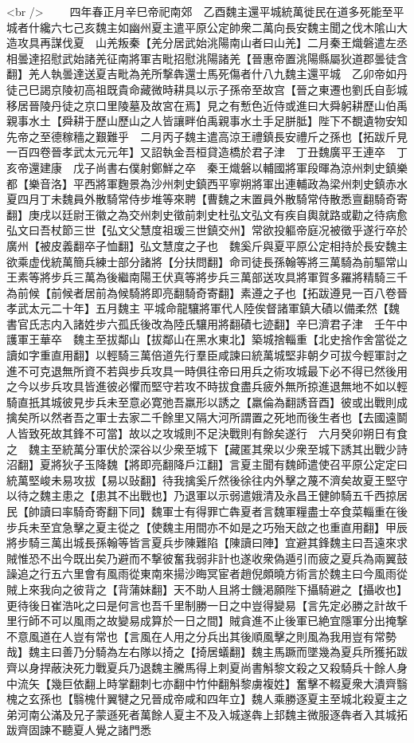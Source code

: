 <br />
　　四年春正月辛巳帝祀南郊　乙酉魏主還平城統萬徙民在道多死能至平城者什纔六七己亥魏主如幽州夏主遣平原公定帥衆二萬向長安魏主聞之伐木隂山大造攻具再謀伐夏　山羌叛秦【羌分居武始洮陽南山者曰山羌】二月秦王熾磐遣左丞相曇達招慰武始諸羌征南將軍吉毗招慰洮陽諸羌【晉惠帝置洮陽縣屬狄道郡曇徒含翻】羌人執曇達送夏吉毗為羌所撃犇還士馬死傷者什八九魏主還平城　乙卯帝如丹徒己巳謁京陵初高祖既貴命藏微時耕具以示子孫帝至故宫【晉之東遷也劉氏自彭城移居晉陵丹徒之京口里陵墓及故宮在焉】見之有慙色近侍或進曰大舜躬耕歷山伯禹親事水土【舜耕于歷山歷山之人皆讓畔伯禹親事水土手足胼胝】陛下不覩遺物安知先帝之至德稼穡之艱難乎　二月丙子魏主遣高涼王禮鎮長安禮斤之孫也【拓跋斤見一百四卷晉孝武太元元年】又詔執金吾桓貸造橋於君子津　丁丑魏廣平王連卒　丁亥帝還建康　戊子尚書右僕射鄭鮮之卒　秦王熾磐以輔國將軍段暉為涼州刺史鎮樂都【樂音洛】平西將軍麴景為沙州刺史鎮西平寧朔將軍出連輔政為梁州刺史鎮赤水　夏四月丁未魏員外散騎常侍步堆等來聘【曹魏之末置員外散騎常侍散悉亶翻騎奇寄翻】庚戌以廷尉王徽之為交州刺史徵前刺史杜弘文弘文有疾自輿就路或勸之待病愈弘文曰吾杖節三世【弘文父慧度祖瑗三世鎮交州】常欲投軀帝庭况被徵乎遂行卒於廣州【被皮義翻卒子恤翻】弘文慧度之子也　魏奚斤與夏平原公定相持於長安魏主欲乘虚伐統萬簡兵練士部分諸將【分扶問翻】命司徒長孫翰等將三萬騎為前驅常山王素等將步兵三萬為後繼南陽王伏真等將步兵三萬部送攻具將軍賀多羅將精騎三千為前候【前候者居前為候騎將即亮翻騎奇寄翻】素遵之子也【拓跋遵見一百八卷晉孝武太元二十年】五月魏主平城命龍驤將軍代人陸俟督諸軍鎮大磧以備柔然【魏書官氏志内入諸姓步六孤氏後改為陸氏驤用將翻磧七迹翻】辛巳濟君子津　壬午中護軍王華卒　魏主至拔鄰山【拔鄰山在黑水東北】築城捨輜重【北史捨作舍當從之讀如字重直用翻】以輕騎三萬倍道先行羣臣咸諫曰統萬城堅非朝夕可拔今輕軍討之進不可克退無所資不若與步兵攻具一時俱往帝曰用兵之術攻城最下必不得已然後用之今以步兵攻具皆進彼必懼而堅守若攻不時拔食盡兵疲外無所掠進退無地不如以輕騎直扺其城彼見步兵未至意必寛弛吾羸形以誘之【羸倫為翻誘音酉】彼或出戰則成擒矣所以然者吾之軍士去家二千餘里又隔大河所謂置之死地而後生者也【去國遠鬬人皆致死故其鋒不可當】故以之攻城則不足決戰則有餘矣遂行　六月癸卯朔日有食之　魏主至統萬分軍伏於深谷以少衆至城下【藏匿其衆以少衆至城下誘其出戰少詩沼翻】夏將狄子玉降魏【將即亮翻降戶江翻】言夏主聞有魏師遣使召平原公定定曰統萬堅峻未易攻拔【易以䜴翻】待我擒奚斤然後徐往内外擊之蔑不濟矣故夏王堅守以待之魏主患之【患其不出戰也】乃退軍以示弱遣娥清及永昌王健帥騎五千西掠居民【帥讀曰率騎奇寄翻下同】魏軍士有得罪亡犇夏者言魏軍糧盡士卒食菜輜重在後步兵未至宜急擊之夏主從之【使魏主用間亦不如是之巧殆天啟之也重直用翻】甲辰將步騎三萬出城長孫翰等皆言夏兵步陳難陷【陳讀曰陣】宜避其鋒魏主曰吾遠來求賊惟恐不出今既出矣乃避而不撃彼奮我弱非計也遂收衆偽遁引而疲之夏兵為兩翼鼓譟追之行五六里會有風雨從東南來揚沙晦冥宦者趙倪頗曉方術言於魏主曰今風雨從賊上來我向之彼背之【背蒲妹翻】天不助人且將士饑渇願陛下攝騎避之【攝收也】更待後日崔浩叱之曰是何言也吾千里制勝一日之中豈得變易【言先定必勝之計故千里行師不可以風雨之故變易成算於一日之間】賊貪進不止後軍已絶宜隱軍分出掩撃不意風道在人豈有常也【言風在人用之分兵出其後順風擊之則風為我用豈有常勢哉】魏主曰善乃分騎為左右隊以掎之【掎居蟻翻】魏主馬蹶而墜幾為夏兵所獲拓跋齊以身捍蔽決死力戰夏兵乃退魏主騰馬得上刺夏尚書斛黎文殺之又殺騎兵十餘人身中流矢【幾巨依翻上時掌翻刺七亦翻中竹仲翻斛黎虜複姓】奮擊不輟夏衆大潰齊翳槐之玄孫也【翳槐什翼犍之兄晉成帝咸和四年立】魏人乘勝逐夏主至城北殺夏主之弟河南公滿及兄子蒙遜死者萬餘人夏主不及入城遂犇上邽魏主微服逐犇者入其城拓跋齊固諫不聽夏人覺之諸門悉